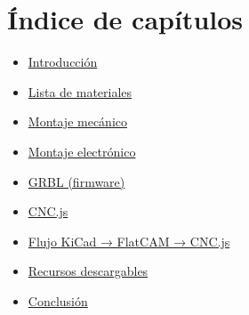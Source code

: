\cleardoublepage
{}
\section*{Índice de capítulos}
\begin{itemize}
  \item \hyperref[ch:intro]{Introducción}
  \item \hyperref[ch:materials]{Lista de materiales}
  \item \hyperref[ch:mechanical]{Montaje mecánico}
  \item \hyperref[ch:electronic]{Montaje electrónico}
  \item \hyperref[ch:grbl]{GRBL (firmware)}
  \item \hyperref[ch:cncjs]{CNC.js}
  \item \hyperref[ch:workflow]{Flujo KiCad → FlatCAM → CNC.js}
  \item \hyperref[ch:resources]{Recursos descargables}
  \item \hyperref[ch:conclusion]{Conclusión}
\end{itemize}

